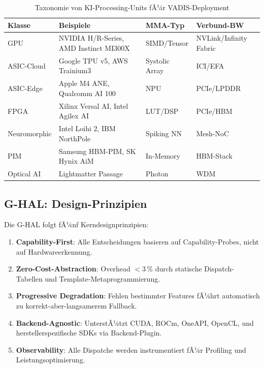 ﻿\documentclass[12pt,a4paper]{article}
\begin{document}
\begin{table}[ht]
\centering
\small
\caption{Taxonomie von KI-Processing-Units fÃ¼r VADIS-Deployment}
\label{tab:aipu_taxonomy}
\begin{tabular}{@{}p{2.0cm}p{2.5cm}p{2.5cm}p{1.5cm}@{}}
\toprule
\textbf{Klasse} & \textbf{Beispiele} & \textbf{MMA-Typ} & \textbf{Verbund-BW} \\
\midrule
GPU & NVIDIA H/R-Series, AMD Instinct MI300X & SIMD/Tensor & NVLink/Infinity Fabric \\
ASIC-Cloud & Google TPU v5, AWS Trainium3 & Systolic Array & ICI/EFA \\
ASIC-Edge & Apple M4 ANE, Qualcomm AI 100 & NPU & PCIe/LPDDR \\
FPGA & Xilinx Versal AI, Intel Agilex AI & LUT/DSP & PCIe/HBM \\
Neuromorphic & Intel Loihi 2, IBM NorthPole & Spiking NN & Mesh-NoC \\
PIM & Samsung HBM-PIM, SK Hynix AiM & In-Memory & HBM-Stack \\
Optical AI & Lightmatter Passage & Photon & WDM \\
\bottomrule
\end{tabular}
\end{table}

\subsection{G-HAL: Design-Prinzipien}
\label{sub:ghal_design}

Die G-HAL folgt fÃ¼nf Kerndesignprinzipien:

\begin{tcolorbox}[keybox, title={G-HAL Design-Prinzipien}]
\small
\begin{enumerate}[leftmargin=1.2em, itemsep=2pt, topsep=0pt]
  \item \textbf{Capability-First}: Alle Entscheidungen basieren
        auf Capability-Probes, nicht auf Hardwareerkennung.
  \item \textbf{Zero-Cost-Abstraction}: Overhead $< 3\,\%$ durch
        statische Dispatch-Tabellen und Template-Metaprogrammierung.
  \item \textbf{Progressive Degradation}: Fehlen bestimmter Features
        fÃ¼hrt automatisch zu korrekt-aber-langsamerem Fallback.
  \item \textbf{Backend-Agnostic}: UnterstÃ¼tzt CUDA, ROCm, OneAPI,
        OpenCL, und herstellerspezifische SDKs via Backend-Plugin.
  \item \textbf{Observability}: Alle Dispatche werden instrumentiert
        fÃ¼r Profiling und Leistungsoptimierung.
\end{enumerate}
\end{tcolorbox}
\end{document}
